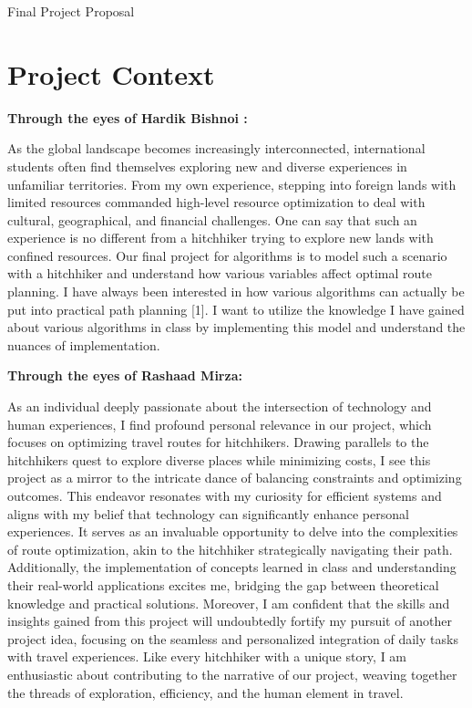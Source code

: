 \documentclass[
]{article}
\author{}
\date{}
\begin{document}
 Final Project Proposal

\section{Project Context}\label{project-context}

\textbf{Through the eyes of Hardik Bishnoi :}

As the global landscape becomes increasingly interconnected,
international students often find themselves exploring new and diverse
experiences in unfamiliar territories. From my own experience, stepping
into foreign lands with limited resources commanded high-level resource
optimization to deal with cultural, geographical, and financial
challenges. One can say that such an experience is no different from a
hitchhiker trying to explore new lands with confined resources. Our
final project for algorithms is to model such a scenario with a
hitchhiker and understand how various variables affect optimal route
planning. I have always been interested in how various algorithms can
actually be put into practical path planning {[}1{]}. I want to utilize
the knowledge I have gained about various algorithms in class by
implementing this model and understand the nuances of implementation.

\textbf{Through the eyes of Rashaad Mirza:}

As an individual deeply passionate about the intersection of technology
and human experiences, I find profound personal relevance in our
project, which focuses on optimizing travel routes for hitchhikers.
Drawing parallels to the hitchhiker\textquotesingle s quest to explore
diverse places while minimizing costs, I see this project as a mirror to
the intricate dance of balancing constraints and optimizing outcomes.
This endeavor resonates with my curiosity for efficient systems and
aligns with my belief that technology can significantly enhance personal
experiences. It serves as an invaluable opportunity to delve into the
complexities of route optimization, akin to the hitchhiker strategically
navigating their path. Additionally, the implementation of concepts
learned in class and understanding their real-world applications excites
me, bridging the gap between theoretical knowledge and practical
solutions. Moreover, I am confident that the skills and insights gained
from this project will undoubtedly fortify my pursuit of another project
idea, focusing on the seamless and personalized integration of daily
tasks with travel experiences. Like every hitchhiker with a unique
story, I am enthusiastic about contributing to the narrative of our
project, weaving together the threads of exploration, efficiency, and
the human element in travel.
\end{document}
